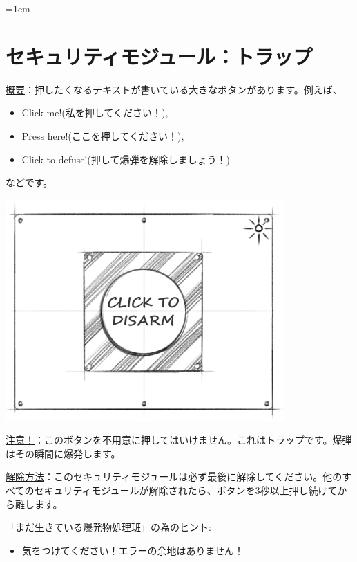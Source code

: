 \begin{minipage}{0.63\textwidth}
    \parskip=1em
    \section*{セキュリティモジュール：トラップ}
    
    \uline{概要}：押したくなるテキストが書いている大きなボタンがあります。例えば{、}

    \begin{itemize}
        \item Click me!(私を押してください！),
        \item Press here!(ここを押してください！),
        \item Click to defuse!(押して爆弾を解除しましょう！)
    \end{itemize}
    
    などです。
\end{minipage}%
\hfill%
\begin{minipage}{0.33\textwidth}
    \includegraphics[width=\textwidth]{images/19.png}
    \vspace*{\fill}
\end{minipage}
    
\uline{注意！}：このボタンを不用意に押してはいけません。これはトラップです。爆弾はその瞬間に爆発します。
    
\uline{解除方法}：このセキュリティモジュールは必ず最後に解除してください。他のすべてのセキュリティモジュールが解除されたら、ボタンを3秒以上押し続けてから離します。

「まだ生きている爆発物処理班」の為のヒント:
\begin{itemize}
    \item 気をつけてください！エラーの余地はありません！
\end{itemize}
